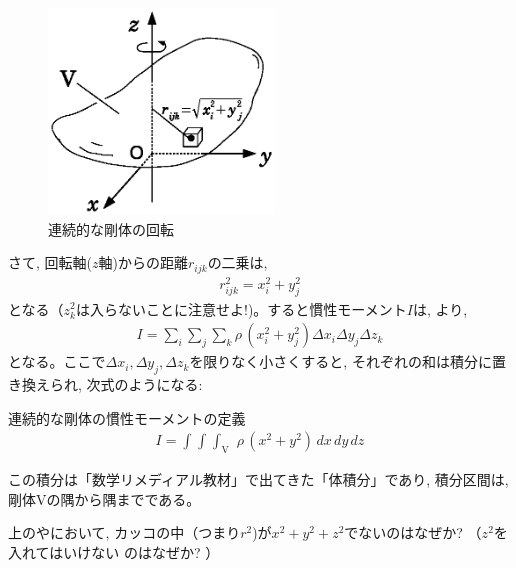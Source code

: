 \begin{figure}[h]
    \centering
    \includegraphics[width=6cm]{angular_mom_rigid.eps}
    \caption{連続的な剛体の回転}\label{fig:angular_mom_rigid}
\end{figure}

さて, 回転軸($z$軸)からの距離$r_{ijk}$の二乗は, 
\begin{eqnarray}
r_{ijk}^2=x_i^2+y_j^2
\end{eqnarray}
となる（$z_k^2$は入らないことに注意せよ!)。すると慣性モーメント$I$は, より, 
\begin{eqnarray}
I=\sum_{i}^{}\sum_{j}^{}\sum_{k}^{} \rho\, (x_i^2+y_j^2) \Delta x_i \Delta y_j \Delta z_k\label{eq:mominert_rigid_sigma}
\end{eqnarray}
となる。ここで$\Delta x_i, \Delta y_j, \Delta z_k$を限りなく小さくすると, 
それぞれの和は積分に置き換えられ, 次式のようになる:
\begin{itembox}{連続的な剛体の慣性モーメントの定義}
\begin{eqnarray}
I=\int_{}^{}\int_{}^{}\int_{\text{V}}^{}\,\, \rho\,(x^2+y^2)\,dx\,dy\,dz\label{eq:mominert_rigid_integ}
\end{eqnarray}
\end{itembox}
この積分は「数学リメディアル教材」で出てきた「体積分」であり, 
積分区間は, 剛体Vの隅から隅までである。\mv

%
\begin{q}\label{q:mominert_r2}
上のやにおいて, 
カッコの中（つまり$r^2$)が$x^2+y^2+z^2$でないのはなぜか? （$z^2$を入れてはいけない
のはなぜか? ）
\end{q}
\mv

